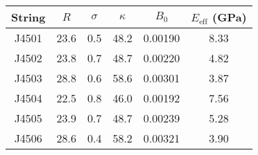 \begin{tabular}{cccccc}
\toprule
String & $R$ & $\sigma$ & $\kappa$ & $B_0$ & $E_\mathrm{eff}$ (GPa) \\
\midrule
J4501 & 23.6 & 0.5 & 48.2 & 0.00190 & 8.33 \\
J4502 & 23.8 & 0.7 & 48.7 & 0.00220 & 4.82 \\
J4503 & 28.8 & 0.6 & 58.6 & 0.00301 & 3.87 \\
J4504 & 22.5 & 0.8 & 46.0 & 0.00192 & 7.56 \\
J4505 & 23.9 & 0.7 & 48.7 & 0.00239 & 5.28 \\
J4506 & 28.6 & 0.4 & 58.2 & 0.00321 & 3.90 \\
\bottomrule
\end{tabular}
